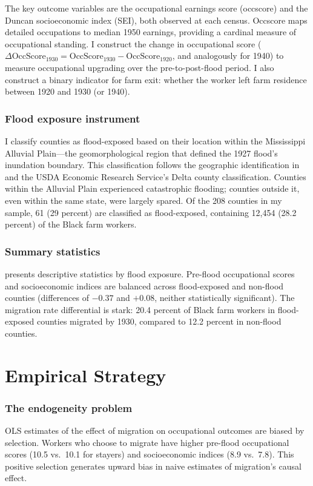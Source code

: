 \documentclass[12pt]{article}
\begin{document}
The key outcome variables are the occupational earnings score (occscore) and the Duncan socioeconomic index (SEI), both observed at each census. Occscore maps detailed occupations to median 1950 earnings, providing a cardinal measure of occupational standing. I construct the change in occupational score ($\Delta \text{OccScore}_{1930} = \text{OccScore}_{1930} - \text{OccScore}_{1920}$, and analogously for 1940) to measure occupational upgrading over the pre-to-post-flood period. I also construct a binary indicator for farm exit: whether the worker left farm residence between 1920 and 1930 (or 1940).

\subsubsection*{Flood exposure instrument} I classify counties as flood-exposed based on their location within the Mississippi Alluvial Plain---the geomorphological region that defined the 1927 flood's inundation boundary. This classification follows the geographic identification in \citet{hornbeck_naidu_2014} and the USDA Economic Research Service's Delta county classification. Counties within the Alluvial Plain experienced catastrophic flooding; counties outside it, even within the same state, were largely spared. Of the 208 counties in my sample, 61 (29 percent) are classified as flood-exposed, containing 12,454 (28.2 percent) of the Black farm workers.

\subsubsection*{Summary statistics}  presents descriptive statistics by flood exposure. Pre-flood occupational scores and socioeconomic indices are balanced across flood-exposed and non-flood counties (differences of $-0.37$ and $+0.08$, neither statistically significant). The migration rate differential is stark: 20.4 percent of Black farm workers in flood-exposed counties migrated by 1930, compared to 12.2 percent in non-flood counties.




\section{Empirical Strategy}

\subsubsection*{The endogeneity problem} OLS estimates of the effect of migration on occupational outcomes are biased by selection. Workers who choose to migrate have higher pre-flood occupational scores (10.5 vs.\ 10.1 for stayers) and socioeconomic indices (8.9 vs.\ 7.8). This positive selection generates upward bias in naive estimates of migration's causal effect.
\end{document}
